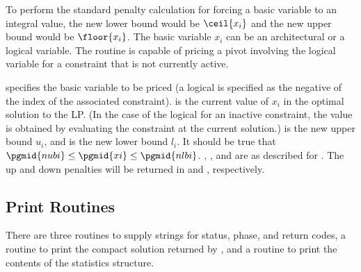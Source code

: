 \begin{subrdoc}
  To perform the standard penalty calculation for forcing a basic variable to
  an integral value, the new lower bound would be $\ceil{x_i}$
  and the new upper bound would be $\floor{x_i}$.
  The basic variable $x_i$ can be an architectural or a logical variable.
  The routine is capable of pricing a pivot involving the logical variable
  for a constraint that is not currently active.

   specifies the basic variable to be priced (a logical is
  specified as the negative of the index of the associated constraint).
   is the current value of $x_i$ in the optimal solution to the
  LP.
  (In the case of the logical for an inactive constraint, the value is obtained
  by evaluating the constraint at the current solution.)
   is the new upper bound $u_i$, and  is the new
  lower bound $l_i$.
  It should be true that $\pgmid{nubi} \leq \pgmid{xi} \leq \pgmid{nlbi}$.
  , , and  are as described for
  .
  The up and down penalties will be returned in  and
  , respectively.

\end{subrdoc}

\subsection{Print Routines}
\label{sec:PrintRoutines}

There are three routines to supply strings for \dylp status, phase, and return
codes, a routine to print the compact solution returned by ,
and a routine to print the contents of the statistics structure.

